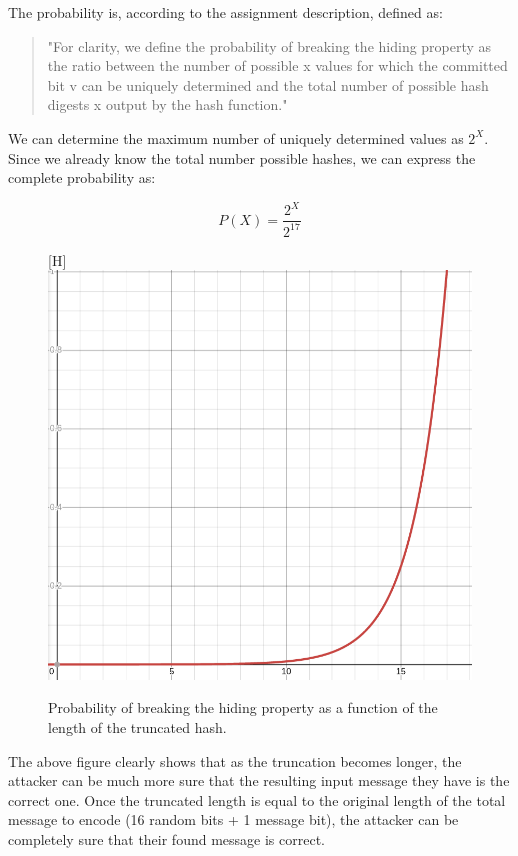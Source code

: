\documentclass[a4paper,11pt]{article}
\begin{document}
The probability is, according to the assignment description, defined as:

\begin{quotation}
"For clarity, we define the probability of breaking the hiding property as the ratio between the number of possible x values for which the committed bit v can be uniquely determined and the total number of possible hash digests x output by the hash function."
\end{quotation}

We can determine the maximum number of uniquely determined values as $ 2^{X} $. Since we already know the total number possible hashes, we can express the complete probability as:

\[ P(X) = \frac{2^{X}}{2^{17}} \]

\begin{figure}
  \begin{center}[H]
    \includegraphics[width=0.7\linewidth]{hiding.png}
    \caption{Probability of breaking the hiding property as a function of the length of the truncated hash.}
    \label{fig:hiding}
  \end{center}
\end{figure}

The above figure clearly shows that as the truncation becomes longer, the attacker can be much more sure that the resulting input message they have is the correct one. Once the truncated length is equal to the original length of the total message to encode (16 random bits + 1 message bit), the attacker can be completely sure that their found message is correct.
\end{document}
